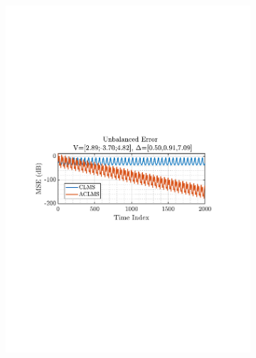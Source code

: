\documentclass[12pt]{article}
\numberwithin{equation}{section}
\begin{document}
\begin{figure}[H]
				\begin{subfigure}{0.49\textwidth}
					\centering
					\includegraphics[trim={2.2cm 11.2cm 3.00cm  11.2cm}, clip, width=\textwidth]{../MATLAB/figures/q3_1e_fig03.pdf} 
					\captionsetup{justification=centering}
				\end{subfigure}
				\begin{subfigure}{0.49\textwidth}
					\centering

\end{subfigure}
\end{figure}
\end{document}
